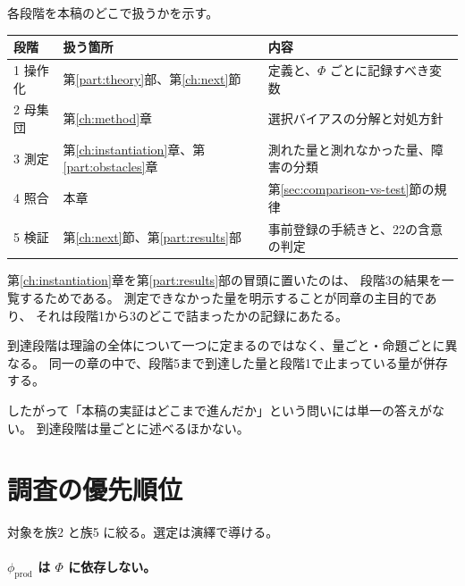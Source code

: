 各段階を本稿のどこで扱うかを示す。

\begin{center}
\begin{tabularx}{\textwidth}{@{}l>{\raggedright\arraybackslash}p{}X@{}}
\toprule
段階 & 扱う箇所 & 内容 \\
\midrule
1 操作化 & 第\ref{part:theory}部、第\ref{ch:next}節 & 定義と、$\Phi$ ごとに記録すべき変数 \\
2 母集団 & 第\ref{ch:method}章 & 選択バイアスの分解と対処方針 \\
3 測定 & 第\ref{ch:instantiation}章、第\ref{part:obstacles}章 & 測れた量と測れなかった量、障害の分類 \\
4 照合 & 本章 & 第\ref{sec:comparison-vs-test}節の規律 \\
5 検証 & 第\ref{ch:next}節、第\ref{part:results}部 & 事前登録の手続きと、22の含意の判定 \\
\bottomrule
\end{tabularx}
\label{tab:stage-mapping}
\end{center}

第\ref{ch:instantiation}章を第\ref{part:results}部の冒頭に置いたのは、
段階3の結果を一覧するためである。
測定できなかった量を明示することが同章の主目的であり、
それは段階1から3のどこで詰まったかの記録にあたる。

\begin{remark}[段階は量ごとに異なる]
\label{rem:stage-per-quantity}
到達段階は理論の全体について一つに定まるのではなく、量ごと・命題ごとに異なる。
同一の章の中で、段階5まで到達した量と段階1で止まっている量が併存する。

したがって「本稿の実証はどこまで進んだか」という問いには単一の答えがない。
到達段階は量ごとに述べるほかない。
\end{remark}


\label{ch:next}


\section{調査の優先順位}

対象を族2 と族5 に絞る。選定は演繹で導ける。

\paragraph{$\phi_{\mathrm{prod}}$ は $\Phi$ に依存しない。}

